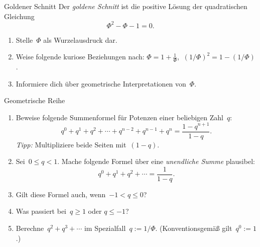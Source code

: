 \documentclass{zirkelblatt}
\begin{document}

\begin{aufgabe}{Goldener Schnitt}
Der \emph{goldene Schnitt} ist die positive Lösung der quadratischen Gleichung
\[ \Phi^2 - \Phi - 1 = 0. \]
\begin{enumerate}
\item Stelle~$\Phi$ als Wurzelausdruck dar.
\item Weise folgende kuriose Beziehungen nach:
$\Phi = 1 + \frac{1}{\Phi}$,$\ $
$(1/\Phi)^2 = 1 - (1/\Phi)$.
\item Informiere dich über geometrische Interpretationen von~$\Phi$.
\end{enumerate}
\end{aufgabe}

\begin{aufgabe}{Geometrische Reihe}
\begin{enumerate}
\item Beweise folgende Summenformel für Potenzen einer beliebigen Zahl~$q$:
\[ q^0 + q^1 + q^2 + \cdots + q^{n-2} + q^{n-1} + q^n = \frac{1 - q^{n+1}}{1 -
q}. \]
\emph{Tipp:} Multipliziere beide Seiten mit~$(1-q)$.

\item Sei~$0 \leq q < 1$. Mache folgende Formel über eine \emph{unendliche
Summe} plausibel:
\[ q^0 + q^1 + q^2 + \cdots = \frac{1}{1 - q}. \]

\item Gilt diese Formel auch, wenn~$-1 < q \leq 0$?

\item Was passiert bei~$q \geq 1$ oder $q \leq -1$?

\item Berechne~$q^2 + q^3 + \cdots$ im Spezialfall~$q := 1/\Phi$.
{(Konventionsgemäß gilt~$q^0 := 1$.)}
\end{enumerate}
\end{aufgabe}

\end{document}
